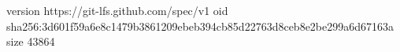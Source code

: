 version https://git-lfs.github.com/spec/v1
oid sha256:3d601f59a6e8c1479b3861209ebeb394cb85d22763d8ceb8e2be299a6d67163a
size 43864
